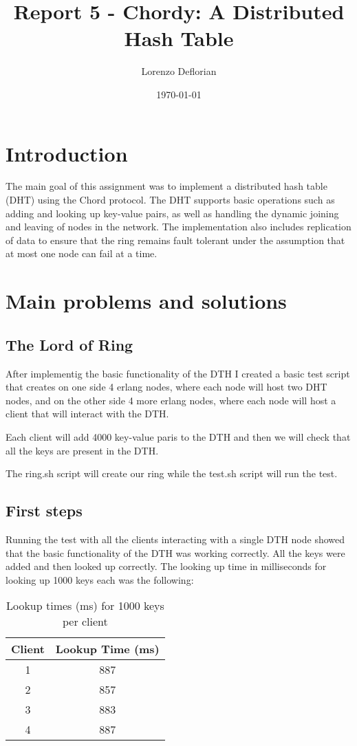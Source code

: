 \documentclass[a4paper, 11pt]{article}
\title{Report 5 - Chordy: A Distributed Hash Table}
\author{Lorenzo Deflorian}
\date{\today{}}
\begin{document}
\maketitle

\section{Introduction}
The main goal of this assignment was to implement a distributed hash table (DHT) using the Chord protocol. The DHT supports basic operations such as adding and looking up key-value pairs, as well as handling the dynamic joining and leaving of nodes in the network. The implementation also includes replication of data to ensure that the ring remains fault tolerant under the assumption that at most one node can fail at a time.

\section{Main problems and solutions}

\subsection{The Lord of Ring}
After implementig the basic functionality of the DTH I created a basic test script that creates on one side 4 erlang nodes, where each node will host two DHT nodes, and on the other side 4 more erlang nodes, where each node will host a client that will interact with the DTH.

Each client will add 4000 key-value paris to the DTH and then we will check that all the keys are present in the DTH.

The ring.sh script will create our ring while the test.sh script will run the test.

\subsection{First steps}
Running the test with all the clients interacting with a single DTH node showed that the basic functionality of the DTH was working correctly. All the keys were added and then looked up correctly. The looking up time in milliseconds for looking up 1000 keys each was the following:
\begin{table}[H]
\centering
\begin{tabular}{|c|c|}
\hline
\textbf{Client} & \textbf{Lookup Time (ms)} \\
\hline
1 & 887 \\
2 & 857 \\
3 & 883 \\
4 & 887 \\
\hline
\end{tabular}
\caption{Lookup times (ms) for 1000 keys per client}
\end{table}
\end{document}
